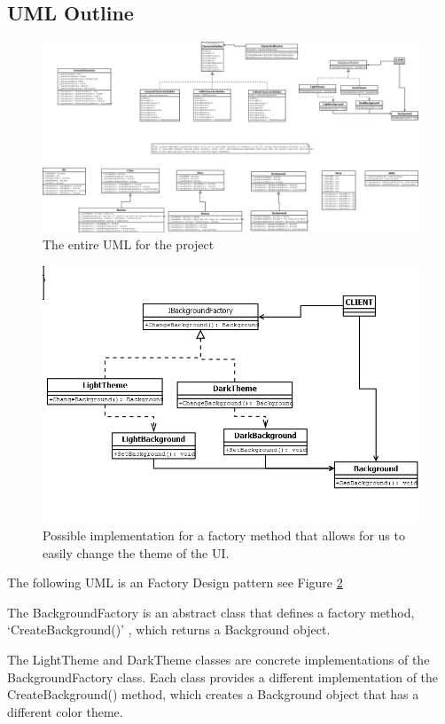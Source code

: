 \documentclass[10pt,conference,onecolumn,compsoc]{IEEEtran}
\begin{document}
\subsection{UML Outline}
\begin{figure}[ht!]
\includegraphics[scale=0.19]{RPGCharacterCreatorUML.png}
\caption{The entire UML for the project}
\label{fullUML}
\end{figure}
\begin{figure}[ht!]
\includegraphics[scale=0.4]{factMethod.png}
\caption{Possible implementation for a factory method that allows for us to easily change the theme of the UI.}
\label{themeFact}
\end{figure}

The following UML is an Factory Design pattern see Figure \ref{themeFact}

The BackgroundFactory is an abstract class that defines a factory method, ‘CreateBackground()’ , which returns a Background object.

The LightTheme and DarkTheme classes are concrete implementations of the BackgroundFactory class. Each class provides a different implementation of the CreateBackground() method, which creates a Background object that has a different color theme.
\end{document}

